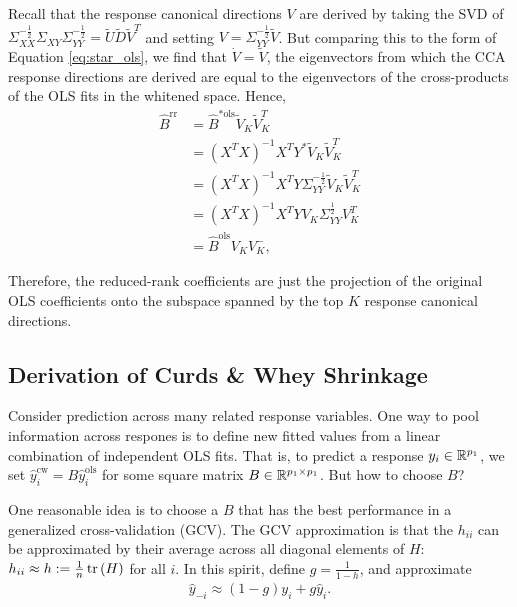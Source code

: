 \documentclass{article}
\begin{document}
Recall that the response canonical directions $V$ are derived by taking the SVD
of $\Sigma_{XX}^{-\frac{1}{2}}\Sigma_{XY}\Sigma_{YY}^{-\frac{1}{2}} =
\tilde{U}\tilde{D}\tilde{V}^{T}$ and setting $V =
\Sigma_{YY}^{-\frac{1}{2}}\tilde{V}$. But comparing this to the form of Equation
\ref{eq:star_ols}, we find that $\dot{V} = \tilde{V}$, the eigenvectors from
which the CCA response directions are derived are equal to the eigenvectors of
the cross-products of the OLS fits in the whitened space. Hence,
\begin{align*}
\hat{B}^{\text{rr}} &= \hat{B}^{\ast \text{ols}}\tilde{V}_{K}\tilde{V}_{K}^{T} \\
&= \left(X^{T}X\right)^{-1}X^{T}Y^{\ast}\tilde{V}_{K}\tilde{V}_{K}^{T} \\
&= \left(X^{T}X\right)^{-1}X^{T}Y\Sigma_{YY}^{-\frac{1}{2}}\tilde{V}_{K}\tilde{V}_{K}^{T} \\
&= \left(X^{T}X\right)^{-1}X^{T}Y V_{K} \Sigma_{YY}^{\frac{1}{2}}V_{K}^{T} \\
&= \hat{B}^{\text{ols}}V_{K}V_{K}^{-},
\end{align*}

Therefore, the reduced-rank coefficients are just the projection of the original
OLS coefficients onto the subspace spanned by the top $K$ response canonical
directions.

\subsection{Derivation of Curds \& Whey Shrinkage}
\label{subsec:derivation_curds_and_whey}

Consider prediction across many related response variables. One way to pool
information across respones is to define new fitted values from a linear
combination of independent OLS fits. That is, to predict a response $y_{i} \in
\mathbb{R}^{p_{1}}$, we set $\hat{y}^{\text{cw}}_{i} = B\hat{y}^{\text{ols}}_{i}$
for some square matrix $B \in \mathbb{R}^{p_{1} \times p_{1}}$. But how to choose
$B$?

One reasonable idea is to choose a $B$ that has the best performance in a
generalized cross-validation (GCV). The GCV approximation is that the $h_{ii}$
can be approximated by their average across all diagonal elements of $H$:
$h_{ii} \approx h := \frac{1}{n}\mathop\mathrm{tr}\left(H\right)$ for all $i$. In this spirit,
define $g = \frac{1}{1 - h}$, and approximate
\begin{align*}
  \hat{y}_{-i} \approx \left(1 - g\right)y_{i} + g\hat{y}_{i}.
\end{align*}
\end{document}
